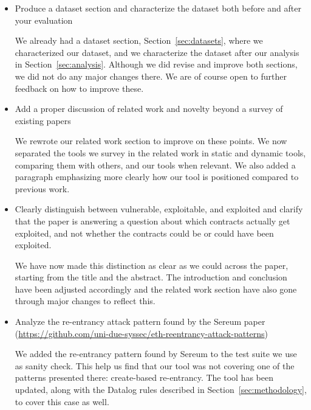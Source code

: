 \begin{itemize}
\item Produce a dataset section and characterize the dataset both before and after your evaluation

  We already had a dataset section, Section~\ref{sec:datasets}, where we characterized our dataset, and we characterize the dataset after our analysis in Section~\ref{sec:analysis}.
  Although we did revise and improve both sections, we did not do any major changes there.
  We are of course open to further feedback on how to improve these.

\item Add a proper discussion of related work and novelty beyond a survey of existing papers

  We rewrote our related work section to improve on these points. We now separated the tools we survey in the related work in static and dynamic tools, comparing them with others, and our tools when relevant. We also added a paragraph emphasizing more clearly how our tool is positioned compared to previous work.

\item Clearly distinguish between vulnerable, exploitable, and exploited and clarify that the paper is answering a question about which contracts actually get exploited, and not whether the contracts could be or could have been exploited.

  We have now made this distinction as clear as we could across the paper, starting from the title and the abstract. The introduction and conclusion have been adjusted accordingly and the related work section have also gone through major changes to reflect this.

\item Analyze the re-entrancy attack pattern found by the Sereum paper (\url{https://github.com/uni-due-syssec/eth-reentrancy-attack-patterns})

  We added the re-entrancy pattern found by Sereum to the test suite we use as sanity check. This help us find that our tool was not covering one of the patterns presented there: create-based re-entrancy. The tool has been updated, along with the Datalog rules described in Section~\ref{sec:methodology}, to cover this case as well.
\end{itemize}
